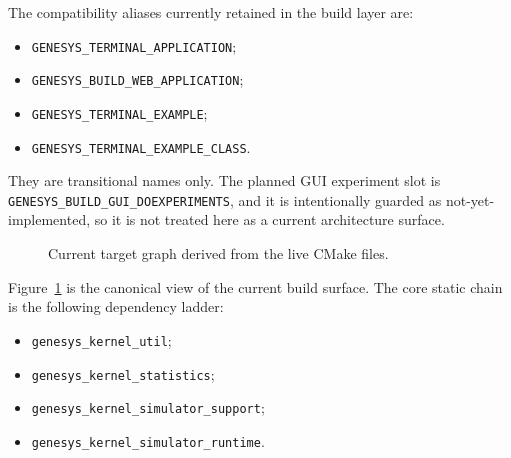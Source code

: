 The compatibility aliases currently retained in the build layer are:
\begin{itemize}
\item \texttt{GENESYS\_TERMINAL\_APPLICATION};
\item \texttt{GENESYS\_BUILD\_WEB\_APPLICATION};
\item \texttt{GENESYS\_TERMINAL\_EXAMPLE};
\item \texttt{GENESYS\_TERMINAL\_EXAMPLE\_CLASS}.
\end{itemize}
They are transitional names only. The planned GUI experiment slot is
\texttt{GENESYS\_BUILD\_GUI\_DOEXPERIMENTS}, and it is intentionally guarded
as not-yet-implemented, so it is not treated here as a current architecture
surface.

\begin{figure}[htbp]
\centering
\caption{Current target graph derived from the live CMake files.}
\label{fig:repo-target-graph}
\end{figure}

Figure~\ref{fig:repo-target-graph} is the canonical view of the current build
surface. The core static chain is the following dependency ladder:
\begin{itemize}
\item \texttt{genesys\_kernel\_util};
\item \texttt{genesys\_kernel\_statistics};
\item \texttt{genesys\_kernel\_simulator\_support};
\item \texttt{genesys\_kernel\_simulator\_runtime}.
\end{itemize}

